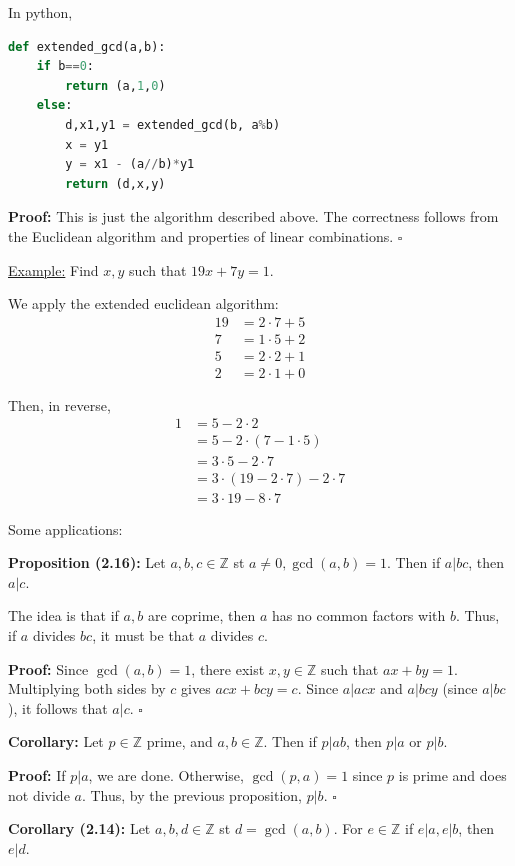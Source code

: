 \documentclass{article}
\newcommand*{\qed}{\hfill$\square$}%
\newcommand*{\zz}{\mathbb{Z}}%
\begin{document}
In python, 
\begin{lstlisting}[language=Python]
def extended_gcd(a,b):
    if b==0:
        return (a,1,0)
    else:
        d,x1,y1 = extended_gcd(b, a%b)
        x = y1
        y = x1 - (a//b)*y1
        return (d,x,y)
\end{lstlisting}

\textbf{Proof:} This is just the algorithm described above. The correctness follows from the Euclidean algorithm and properties of linear combinations. \qed

\underline{Example:} Find $x,y$ such that $19x+7y=1$. 

We apply the extended euclidean algorithm: \begin{align*}
    19 &= 2\cdot 7 + 5 \\
    7 &= 1\cdot 5 + 2 \\
    5 &= 2\cdot 2 + 1 \\
    2 &= 2\cdot 1 + 0
\end{align*}

Then, in reverse, \begin{align*}
    1 &= 5 - 2\cdot 2 \\
      &= 5 - 2\cdot (7 - 1\cdot 5) \\
      &= 3\cdot 5 - 2\cdot 7 \\
      &= 3\cdot (19 - 2\cdot 7) - 2\cdot 7 \\
      &= 3\cdot 19 - 8\cdot 7
\end{align*}

Some applications:

\textbf{Proposition (2.16):} Let $a,b,c\in \zz$ st $a\neq 0, \gcd(a,b)=1$. Then if $a|bc$, then $a|c$.

The idea is that if $a,b$ are coprime, then $a$ has no common factors with $b$. Thus, if $a$ divides $bc$, it must be that $a$ divides $c$.

\textbf{Proof:} Since $\gcd(a,b)=1$, there exist $x,y\in \zz$ such that $ax+by=1$. Multiplying both sides by $c$ gives $acx + bcy = c$. Since $a|acx$ and $a|bcy$ (since $a|bc$), it follows that $a|c$. \qed

\textbf{Corollary:} Let $p\in \zz$ prime, and $a,b\in \zz$. Then if $p|ab$, then $p|a$ or $p|b$.

\textbf{Proof:} If $p|a$, we are done. Otherwise, $\gcd(p,a)=1$ since $p$ is prime and does not divide $a$. Thus, by the previous proposition, $p|b$. \qed

\textbf{Corollary (2.14):} Let $a,b,d\in \zz$ st $d=\gcd(a,b)$. For $e\in \zz$ if $e|a, e|b$, then $e|d$.
\end{document}
